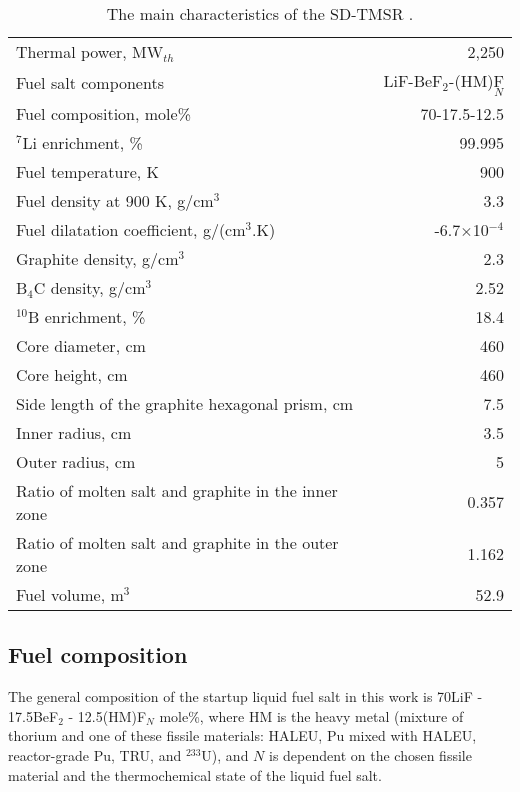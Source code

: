 \begin{table}  %
	\caption{The main characteristics of the SD-TMSR \cite{li_optimization_2018,ashraf2019whole_core}.}
	\vspace{0.1in}
	\begin{tabularx}{\textwidth}{l | r}
		\hline
		Thermal power, MW$_{th}$          				&  2,250  \\ 
		Fuel salt components                            & LiF-BeF$_2$-(\gls{HM})F$_N$ \\
		Fuel composition, mole\%                        & 70-17.5-12.5    \\
		$^7$Li enrichment, \%        				& 99.995   \\
		Fuel temperature, K 							& 900  \\
		Fuel density at 900 K, g/cm$^3$		  		& 3.3 \\
		Fuel dilatation coefficient, g/(cm$^3$$.$K)  &  -6.7$\times$10$^{-4}$ \\
		Graphite density, g/cm$^3$             	    & 2.3	\\  
		B$_4$C density, g/cm$^3$					& 2.52  \\
		$^{10}$B enrichment, \%						&  18.4  \\
		Core diameter, cm								& 460  \\
		Core height, cm									& 460  \\
		Side length of the graphite hexagonal prism, cm   & 7.5 \\
		Inner radius, cm							& 3.5  \\
		Outer radius, cm							& 5  \\
		Ratio of molten salt and graphite in the inner zone	&  0.357  \\
		Ratio of molten salt and graphite in the outer zone &  1.162  \\
		Fuel volume, m$^3$  &	52.9 \\
		\hline
	\end{tabularx}
	\label{tab:table1}
\end{table}

\subsection{Fuel composition}
The general composition of the startup liquid fuel salt in this work is 70LiF - 
17.5BeF$_2$ - 12.5(HM)F$_N$ mole\%, where HM is the heavy metal (mixture of 
thorium and one of these fissile materials: \gls{HALEU}, Pu mixed with \gls{HALEU}, reactor-grade Pu, \gls{TRU}, and $^{233}$U), and $N$ is dependent on the chosen fissile material and the thermochemical state of the liquid fuel salt.

